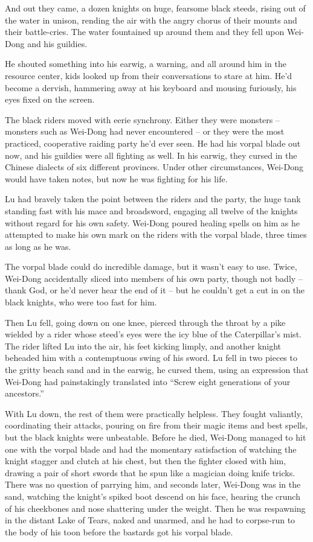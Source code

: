 And out they came, a dozen knights on huge, fearsome black steeds,
rising out of the water in unison, rending the air with the angry
chorus of their mounts and their battle-cries. The water fountained
up around them and they fell upon Wei-Dong and his guildies.

He shouted something into his earwig, a warning, and all around him
in the resource center, kids looked up from their conversations to
stare at him. He'd become a dervish, hammering away at his keyboard
and mousing furiously, his eyes fixed on the screen.

The black riders moved with eerie synchrony. Either they were
monsters -- monsters such as Wei-Dong had never encountered -- or
they were the most practiced, cooperative raiding party he'd ever
seen. He had his vorpal blade out now, and his guildies were all
fighting as well. In his earwig, they cursed in the Chinese
dialects of six different provinces. Under other circumstances,
Wei-Dong would have taken notes, but now he was fighting for his
life.

Lu had bravely taken the point between the riders and the party,
the huge tank standing fast with his mace and broadsword, engaging
all twelve of the knights without regard for his own safety.
Wei-Dong poured healing spells on him as he attempted to make his
own mark on the riders with the vorpal blade, three times as long
as he was.

The vorpal blade could do incredible damage, but it wasn't easy to
use. Twice, Wei-Dong accidentally sliced into members of his own
party, though not badly -- thank God, or he'd never hear the end of
it -- but he couldn't get a cut in on the black knights, who were
too fast for him.

Then Lu fell, going down on one knee, pierced through the throat by
a pike wielded by a rider whose steed's eyes were the icy blue of
the Caterpillar's mist. The rider lifted Lu into the air, his feet
kicking limply, and another knight beheaded him with a contemptuous
swing of his sword. Lu fell in two pieces to the gritty beach sand
and in the earwig, he cursed them, using an expression that
Wei-Dong had painstakingly translated into ``Screw eight generations
of your ancestors.''

With Lu down, the rest of them were practically helpless. They
fought valiantly, coordinating their attacks, pouring on fire from
their magic items and best spells, but the black knights were
unbeatable. Before he died, Wei-Dong managed to hit one with the
vorpal blade and had the momentary satisfaction of watching the
knight stagger and clutch at his chest, but then the fighter closed
with him, drawing a pair of short swords that he spun like a
magician doing knife tricks. There was no question of parrying him,
and seconds later, Wei-Dong was in the sand, watching the knight's
spiked boot descend on his face, hearing the crunch of his
cheekbones and nose shattering under the weight. Then he was
respawning in the distant Lake of Tears, naked and unarmed, and he
had to corpse-run to the body of his toon before the bastards got
his vorpal blade.

